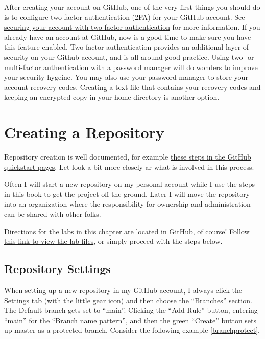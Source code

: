 \justify{}
After creating your account on GitHub, one of the very first things you should do is to configure two-factor authentication (2FA) for your GitHub account.
See \href{https://docs.github.com/en/github/authenticating-to-github/securing-your-account-with-two-factor-authentication-2fa}{securing your account with two factor authentication}
for more information. If you already have an account at GitHub, now is a good time to make sure you have this feature enabled. Two-factor authentication provides
an additional layer of security on your Github account, and is all-around good practice. Using two- or multi-factor authentication with a
password manager will do wonders
to improve your security hygeine. You may also use your password manager to store your account recovery codes. Creating a text file 
that contains your recovery codes and keeping an encrypted copy in your home directory is another option.

\section{Creating a Repository}

Repository creation is well documented, for example
\href{https://docs.github.com/en/get-started/quickstart/create-a-repo}{these steps in the GitHub quickstart pages}. Let look a bit 
more closely ar what is involved in this process.

\justify{}
Often I will start a new repository on my personal account while I use the steps in this book to get the project off the ground.
Later I will move the repository into an organization where the responsibility for ownership and administration can be
shared with other folks.

\justify{}
Directions for the labs in this chapter are located in GitHub, of course! 
\href{https://github.com/devsecfranklin/devsecops-tactical-workbook/tree/main/code/chapter-four}{Follow this link to view the lab files},
or simply proceed with the steps below.


\subsection{Repository Settings}

\justify{}
When setting up a new repository in my GitHub account, I always click the Settings tab (with the little gear icon) and then choose the
``Branches'' section. The Default branch gets set to ``main''. Clicking the ``Add Rule'' button, entering ``main'' for the ``Branch name pattern'',
and then the green ``Create'' button sets up master as a protected branch. Consider the following example \ref{branchprotect}.

